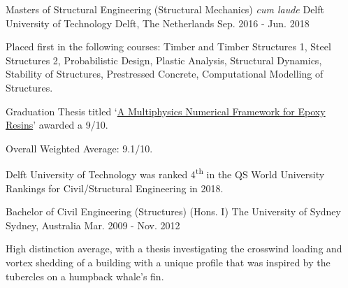

\begin{cventries}

    \cventry
    {Masters of Structural Engineering (Structural Mechanics) \emph{cum laude}} %
    {Delft University of Technology} %
    {Delft, The Netherlands} %
    {Sep. 2016 - Jun. 2018} %
    {
      \begin{cvitems} %
        \item {Placed first in the following courses: Timber and Timber Structures 1, Steel Structures 2, Probabilistic Design, Plastic Analysis, Structural Dynamics, Stability of Structures, Prestressed Concrete, Computational Modelling of Structures.}
        \item {Graduation Thesis titled `\href{https://repository.tudelft.nl/islandora/object/uuid\%3A86d469f3-0c44-4f45-9396-ec296d87031f?collection=education}{A Multiphysics Numerical Framework for Epoxy Resins}' awarded a 9/10.}
        \item {Overall Weighted Average: 9.1/10.}
        \item {Delft University of Technology was ranked 4\textsuperscript{th} in the QS World University Rankings for Civil/Structural Engineering in 2018.}
      \end{cvitems}
    }
    \cventry
    {Bachelor of Civil Engineering (Structures) (Hons. I)} %
    {The University of Sydney} %
    {Sydney, Australia} %
    {Mar. 2009 - Nov. 2012} %
    {
      \begin{cvitems} %
        \item {High distinction average, with a thesis investigating the crosswind loading and vortex shedding of a building with a unique profile that was inspired by the tubercles on a humpback whale's fin.}
      \end{cvitems}
    }

\end{cventries}
